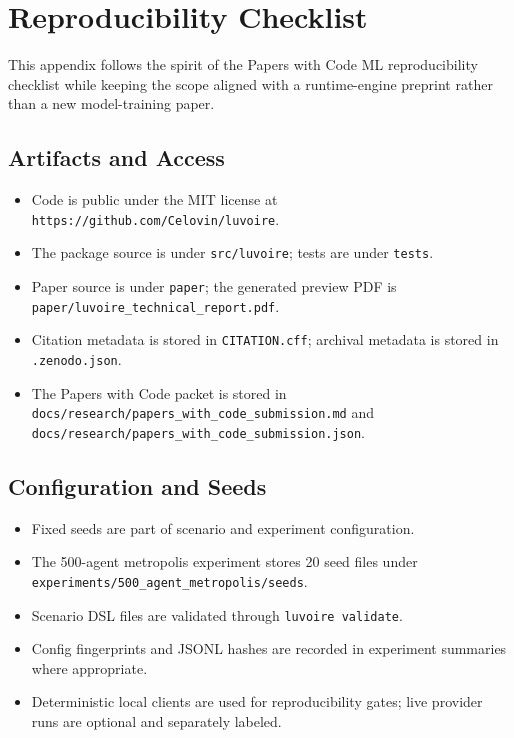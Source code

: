 \section{Reproducibility Checklist}

This appendix follows the spirit of the Papers with Code ML reproducibility checklist while keeping the scope aligned with a runtime-engine preprint rather than a new model-training paper.

\subsection{Artifacts and Access}

\begin{itemize}
  \item Code is public under the MIT license at \texttt{https://github.com/Celovin/luvoire}.
  \item The package source is under \texttt{src/luvoire}; tests are under \texttt{tests}.
  \item Paper source is under \texttt{paper}; the generated preview PDF is \texttt{paper/luvoire\_technical\_report.pdf}.
  \item Citation metadata is stored in \texttt{CITATION.cff}; archival metadata is stored in \texttt{.zenodo.json}.
  \item The Papers with Code packet is stored in \texttt{docs/research/papers\_with\_code\_submission.md} and \texttt{docs/research/papers\_with\_code\_submission.json}.
\end{itemize}

\subsection{Configuration and Seeds}

\begin{itemize}
  \item Fixed seeds are part of scenario and experiment configuration.
  \item The 500-agent metropolis experiment stores 20 seed files under \texttt{experiments/500\_agent\_metropolis/seeds}.
  \item Scenario DSL files are validated through \texttt{luvoire validate}.
  \item Config fingerprints and JSONL hashes are recorded in experiment summaries where appropriate.
  \item Deterministic local clients are used for reproducibility gates; live provider runs are optional and separately labeled.
\end{itemize}

